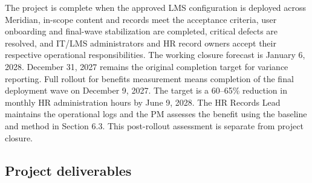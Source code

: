 The project is complete when the approved LMS configuration is deployed across Meridian, in-scope content and records meet the acceptance criteria, user onboarding and final-wave stabilization are completed, critical defects are resolved, and IT/\allowbreak{}LMS administrators and HR record owners accept their respective operational responsibilities. The working closure forecast is January 6, 2028. December 31, 2027 remains the original completion target for variance reporting. Full rollout for benefits measurement means completion of the final deployment wave on December 9, 2027. The target is a 60--65\% reduction in monthly HR administration hours by June 9, 2028. The HR Records Lead maintains the operational logs and the PM assesses the benefit using the baseline and method in Section 6.3. This post-rollout assessment is separate from project closure.


\clearpage
\subsection{Project deliverables}\label{sec:1.2}

